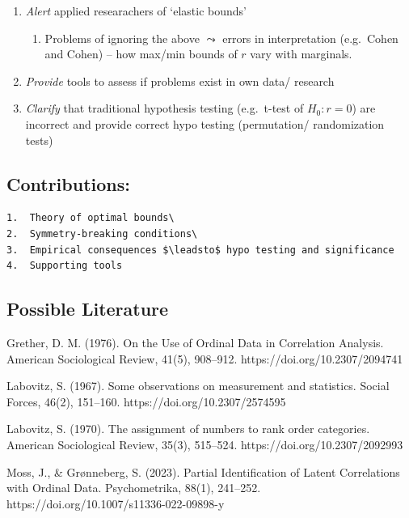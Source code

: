 \documentclass[
  12pt,
]{article}
\providecommand{\tightlist}{%
  \setlength{\itemsep}{0pt}\setlength{\parskip}{0pt}}\usepackage{longtable,booktabs,array}
\theoremstyle{plain}
\theoremstyle{definition}
\theoremstyle{remark}
\begin{document}
\begin{enumerate}
\def\labelenumi{\arabic{enumi}.}
\tightlist
\item
  \emph{Alert} applied researachers of `elastic bounds'

  \begin{enumerate}
  \def\labelenumii{\arabic{enumii}.}
  \tightlist
  \item
    Problems of ignoring the above \(\leadsto\) errors in interpretation
    (e.g.~Cohen and Cohen) -- how max/min bounds of \(r\) vary with
    marginals.\\
  \end{enumerate}
\item
  \emph{Provide} tools to assess if problems exist in own data/ research
\item
  \emph{Clarify} that traditional hypothesis testing (e.g.~t-test of
  \(H_0: r= 0\)) are incorrect and provide correct hypo testing
  (permutation/ randomization tests)
\end{enumerate}

\subsection{Contributions:}\label{contributions}

\begin{verbatim}
1.  Theory of optimal bounds\
2.  Symmetry-breaking conditions\
3.  Empirical consequences $\leadsto$ hypo testing and significance
4.  Supporting tools
\end{verbatim}

\subsection{Possible Literature}\label{possible-literature}

Grether, D. M. (1976). On the Use of Ordinal Data in Correlation
Analysis. American Sociological Review, 41(5), 908--912.
https://doi.org/10.2307/2094741

Labovitz, S. (1967). Some observations on measurement and statistics.
Social Forces, 46(2), 151--160. https://doi.org/10.2307/2574595

Labovitz, S. (1970). The assignment of numbers to rank order categories.
American Sociological Review, 35(3), 515--524.
https://doi.org/10.2307/2092993

Moss, J., \& Grønneberg, S. (2023). Partial Identification of Latent
Correlations with Ordinal Data. Psychometrika, 88(1), 241--252.
https://doi.org/10.1007/s11336-022-09898-y
\end{document}
